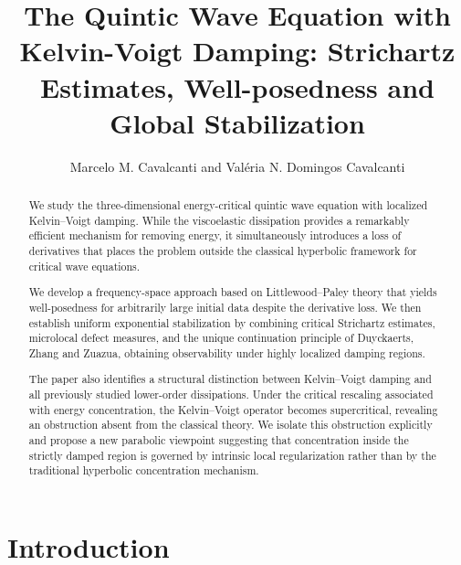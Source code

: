 \documentclass[11pt,letterpaper]{amsart}
\title[Critical Wave Equation with Nonlinear Kelvin-Voigt Damping]{The Quintic Wave Equation with Kelvin-Voigt Damping: Strichartz Estimates, Well-posedness and Global Stabilization}
\author{Marcelo M. Cavalcanti and Val\'eria N. Domingos Cavalcanti}
\begin{document}
\begin{abstract}
We study the three-dimensional energy-critical quintic wave equation with localized Kelvin--Voigt damping. While the viscoelastic dissipation provides a remarkably efficient mechanism for removing energy, it simultaneously introduces a loss of derivatives that places the problem outside the classical hyperbolic framework for critical wave equations.

We develop a frequency-space approach based on Littlewood--Paley theory that yields well-posedness for arbitrarily large initial data despite the derivative loss. We then establish uniform exponential stabilization by combining critical Strichartz estimates, microlocal defect measures, and the unique continuation principle of Duyckaerts, Zhang and Zuazua, obtaining observability under highly localized damping regions.

The paper also identifies a structural distinction between Kelvin--Voigt damping and all previously studied lower-order dissipations. Under the critical rescaling associated with energy concentration, the Kelvin--Voigt operator becomes supercritical, revealing an obstruction absent from the classical theory. We isolate this obstruction explicitly and propose a new parabolic viewpoint suggesting that concentration inside the strictly damped region is governed by intrinsic local regularization rather than by the traditional hyperbolic concentration mechanism.

\end{abstract}
\maketitle

\tableofcontents

\section{Introduction}
\end{document}
